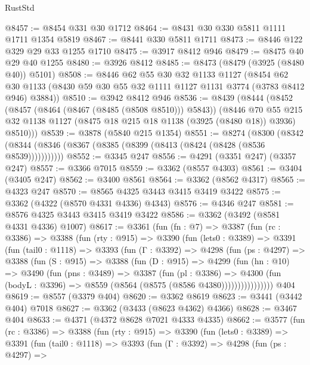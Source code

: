 \begin{lexlean}{RustStd}
\begin{coremodule}
@8457 := @8454 @331 @30 @1712
@8464 := @8431 @30 @330 @5811 @1111 @1711 @1354 @5819
@8467 := @8441 @330 @5811 @1711
@8473 := @8446 @122 @329 @29 @33 @1255 @1710
@8475 := @3917 @8412 @946
@8479 := @8475 @40 @29 @40 @1255
@8480 := @3926 @8412
@8485 := @8473 (@8479 (@3925 (@8480 @40)) @5101)
@8508 := @8446
    @62
    @55
    @30
    @32
    @1133
    @1127
    (@8454 @62 @30 @1133 (@8430 @59 @30 @55 @32 @1111 @1127 @1131 @3774 (@3783 @8412 @946) @3884))
@8510 := @3942 @8412 @946
@8536 := @8439
    (@8444
      (@8452
        (@8457 (@8464 (@8467 (@8485 (@8508 @8510))) @5843))
        (@8446
          @70
          @55
          @215
          @32
          @1138
          @1127
          (@8475 @18 @215 @18 @1138 (@3925 (@8480 @18)) @3936)
          @8510)))
@8539 := @3878 (@5840 @215 @1354)
@8551 := @8274
    (@8300 (@8342 (@8344 (@8346 (@8367 (@8385 (@8399 (@8413 (@8424 (@8428 (@8536 @8539)))))))))))
@8552 := @3345 @247
@8556 := @4291 (@3351 @247) (@3357 @247)
@8557 := @3366 @7015
@8559 := @3362 (@8557 @4303)
@8561 := @3404 (@3405 @247)
@8562 := @3400 @8561
@8564 := @3362 (@8562 @4317)
@8565 := @4323 @247
@8570 := @8565 @4325 @3443 @3415 @3419 @3422
@8575 := @3362 (@4322 (@8570 @4331 @4336) @4343)
@8576 := @4346 @247
@8581 := @8576 @4325 @3443 @3415 @3419 @3422
@8586 := @3362 (@3492 (@8581 @4331 @4336) @1007)
@8617 := @3361
    (fun (fn : @7) =>
    @3387
      (fun (rc : @3386) =>
      @3388
        (fun (rty : @915) =>
        @3390
          (fun (lets0 : @3389) =>
          @3391
            (fun (tail0 : @1118) =>
            @3393
              (fun (Γ : @3392) =>
              @4298
                (fun (ps : @4297) =>
                @3388
                  (fun (S : @915) =>
                  @3388
                    (fun (D : @915) =>
                    @4299
                      (fun (hn : @10) =>
                      @3490
                        (fun (pns : @3489) =>
                        @3387
                          (fun (pl : @3386) =>
                          @4300
                            (fun (bodyL : @3396) => @8559 (@8564 (@8575 (@8586 @4380))))))))))))))))
    @404
@8619 := @8557 (@3379 @404)
@8620 := @3362 @8619
@8623 := @3441 (@3442 @404) @7018
@8627 := @3362 (@3433 (@8623 @4362) @4366)
@8628 := @3467 @404
@8633 := @4371 (@4372 @8628 @7021 @4333 @4335)
@8662 := @3577
    (fun (rc : @3386) =>
    @3388
      (fun (rty : @915) =>
      @3390
        (fun (lets0 : @3389) =>
        @3391
          (fun (tail0 : @1118) =>
          @3393
            (fun (Γ : @3392) =>
            @4298
              (fun (ps : @4297) =>

\end{coremodule}
\end{lexlean}
